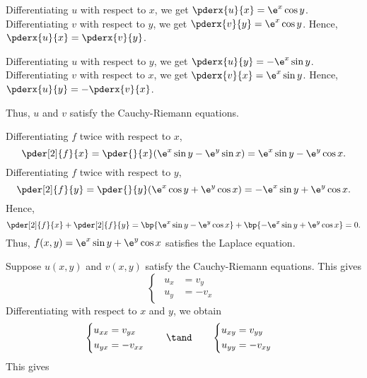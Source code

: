 \begin{solution}
    \begin{ppart}
        Differentiating $u$ with respect to $x$, we get $\pderx{u}{x} = \e^x \cos y$. Differentiating $v$ with respect to $y$, we get $\pderx{v}{y} = \e^x \cos y$. Hence, $\pderx{u}{x} = \pderx{v}{y}$.

        Differentiating $u$ with respect to $y$, we get $\pderx{u}{y} = -\e^x \sin y$. Differentiating $v$ with respect to $x$, we get $\pderx{v}{x} = \e^x \sin y$. Hence, $\pderx{u}{y} = -\pderx{v}{x}$.
        
        Thus, $u$ and $v$ satisfy the Cauchy-Riemann equations.
    \end{ppart}
    \begin{ppart}
        Differentiating $f$ twice with respect to $x$, \[\pder[2]{f}{x} = \pder{}{x} (\e^x \sin y - \e^y \sin x) = \e^x \sin y - \e^y \cos x.\] Differentiating $f$ twice with respect to $y$, \[\pder[2]{f}{y} = \pder{}{y} (\e^x \cos y + \e^y \cos x) = -\e^x \sin y + \e^y \cos x.\] Hence,\[\pder[2]{f}{x} + \pder[2]{f}{y} = \bp{\e^x \sin y - \e^y \cos x} + \bp{-\e^x \sin y + \e^y \cos x} = 0.\] Thus, $f(x, y) = \e^x \sin y + \e^y \cos x$ satisfies the Laplace equation.
    \end{ppart}
    \begin{ppart}
        Suppose $u(x, y)$ and $v(x, y)$ satisfy the Cauchy-Riemann equations. This gives
        \[\begin{cases}
            \begin{aligned}
                u_x &= v_y\\
                u_y &= -v_x
            \end{aligned}
        \end{cases}
        \]
        Differentiating with respect to $x$ and $y$, we obtain
        \[\begin{cases}
            \begin{aligned}
                u_{xx} &= v_{yx}\\
                u_{yx} &= -v_{xx}
            \end{aligned}
        \end{cases} \quad \tand \qquad \begin{cases}
            \begin{aligned}
                u_{xy} &= v_{yy}\\
                u_{yy} &= -v_{xy}
            \end{aligned}
        \end{cases}\] This gives

\end{ppart}
\end{solution}
